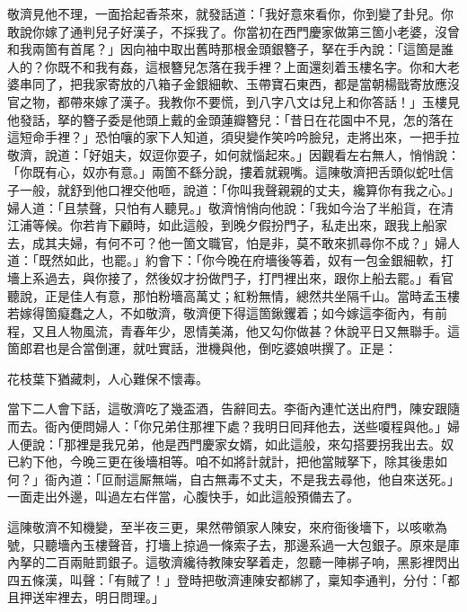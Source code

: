 敬濟見他不理，一面拾起香茶來，就發話道：「我好意來看你，你到變了卦兒。你敢說你嫁了通判兒子好漢子，不採我了。你當初在西門慶家做第三箇小老婆，沒曾和我兩箇有首尾？」因向袖中取出舊時那根金頭銀簪子，拏在手內說：「這箇是誰人的？你既不和我有姦，這根簪兒怎落在我手裡？上面還刻着玉樓名字。你和大老婆串同了，把我家寄放的八箱子金銀細軟、玉帶寶石東西，都是當朝楊戩寄放應沒官之物，都帶來嫁了漢子。我教你不要慌，到八字八文は兒上和你答話！」玉樓見他發話，拏的簪子委是他頭上戴的金頭蓮瓣簪兒：「昔日在花園中不見，怎的落在這短命手裡？」恐怕嚷的家下人知道，須臾變作笑吟吟臉兒，走將出來，一把手拉敬濟，說道：「好姐夫，奴逗你耍子，如何就惱起來。」因觀看左右無人，悄悄說：「你既有心，奴亦有意。」{}兩箇不繇分說，摟着就親嘴。這陳敬濟把舌頭似蛇吐信子一般，就舒到他口裡交他咂，說道：「你叫我聲親親的丈夫，纔算你有我之心。」婦人道：「且禁聲，只怕有人聽見。」敬濟悄悄向他說：「我如今治了半船貨，在清江浦等候。你若肯下顧時，如此這般，到晚夕假扮門子，私走出來，跟我上船家去，成其夫婦，有何不可？他一箇文職官，怕是非，莫不敢來抓尋你不成？」{}婦人道：「既然如此，也罷。」約會下：「你今晚在府墻後等着，奴有一包金銀細軟，打墻上系過去，與你接了，然後奴才扮做門子，打門裡出來，跟你上船去罷。」看官聽說，正是佳人有意，那怕粉墻高萬丈；紅粉無情，總然共坐隔千山。當時孟玉樓若嫁得箇癡蠢之人，不如敬濟，敬濟便下得這箇鍬钁着；如今嫁這李衙內，有前程，又且人物風流，青春年少，恩情美滿，他又勾你做甚？休說平日又無聯手。{}{}這箇郎君也是合當倒運，就吐實話，泄機與他，倒吃婆娘哄撰了。正是：

\begin{myquote}
花枝葉下猶藏刺，人心難保不懷毒。
\end{myquote}

當下二人會下話，這敬濟吃了幾盃酒，告辭囘去。李衙內連忙送出府門，陳安跟隨而去。衙內便問婦人：「你兄弟住那裡下處？我明日囘拜他去，送些嗄程與他。」婦人便說：「那裡是我兄弟，他是西門慶家女婿，如此這般，來勾搭要拐我出去。奴已約下他，今晚三更在後墻相等。咱不如將計就計，把他當賊拏下，除其後患如何？」{}衙內道：「叵耐這厮無端，自古無毒不丈夫，不是我去尋他，他自來送死。」一面走出外邊，叫過左右伴當，心腹快手，如此這般預備去了。

這陳敬濟不知機變，至半夜三更，果然帶領家人陳安，來府衙後墻下，以咳嗽為號，只聽墻內玉樓聲音，打墻上掠過一條索子去，那邊系過一大包銀子。原來是庫內拏的二百兩賍罰銀子。這敬濟纔待教陳安拏着走，忽聽一陣梆子响，黑影裡閃出四五條漢，叫聲：「有賊了！」登時把敬濟連陳安都綁了，稟知李通判，分付：「都且押送牢裡去，明日問理。」

